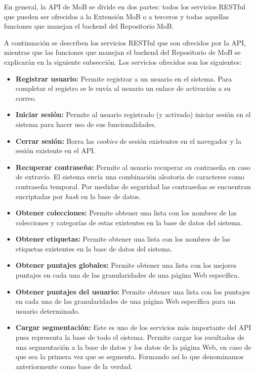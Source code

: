 \documentclass[10pt]{revecom}
\begin{document}
En general, la API de MoB se divide en dos partes: todos los servicios RESTful que pueden ser ofrecidos a la Extensión MoB o a terceros y todas aquellas funciones que manejan el backend del Repositorio MoB.

A continuación se describen los servicios RESTful que son ofrecidos por la API, mientras que las funciones que manejan el backend del Repositorio de MoB se explicarán en la siguiente subsección. Los servicios ofrecidos son los siguientes:
\begin{itemize}
\item \textbf{Registrar usuario:} Permite registrar a un usuario en el sistema. Para completar el registro se le envía al usuario un enlace de activación a su correo. 

\item \textbf{Iniciar sesión:} Permite al usuario registrado (y activado) iniciar sesión en el sistema para hacer uso de sus funcionalidades. 

\item \textbf{Cerrar sesión:} Borra las \textit{cookies} de sesión existentes en el navegador y la sesión existente en el API. 

\item \textbf{Recuperar contraseña:} Permite al usuario recuperar su contraseña en caso de extravío. El sistema envía una combinación aleatoria de caracteres como contraseña temporal. Por medidas de seguridad las contraseñas se encuentran encriptadas por \textit{hash} en la base de datos. 

\item \textbf{Obtener colecciones:} Permite obtener una lista con los nombres de las colecciones y categorías de estas existentes en la base de datos del sistema.

\item \textbf{Obtener etiquetas:} Permite obtener una lista con los nombres de las etiquetas existentes en la base de datos del sistema.

\item \textbf{Obtener puntajes globales:} Permite obtener una lista con los mejores puntajes en cada una de las granularidades de una página Web específica.

\item \textbf{Obtener puntajes del usuario:} Permite obtener una lista con los puntajes en cada una de las granularidades de una página Web específica para un usuario determinado.

\item \textbf{Cargar segmentación:} Este es uno de los servicios más importante del API pues representa la base de todo el sistema. Permite cargar los resultados de una segmentación a la base de datos y los datos de la página Web, en caso de que sea la primera vez que se segmenta. Formando así lo que denominamos anteriormente como base de la verdad.


\end{itemize}
\end{document}
